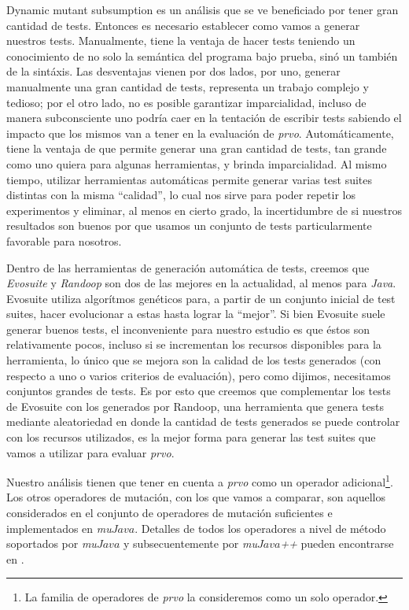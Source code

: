 Dynamic mutant subsumption es un an\'alisis que se ve beneficiado por tener gran cantidad de tests. Entonces es necesario establecer como vamos a generar nuestros tests. Manualmente, tiene la ventaja de hacer tests teniendo un conocimiento de no solo la sem\'antica del programa bajo prueba, sin\'o un tambi\'en de la sint\'axis. Las desventajas vienen por dos lados, por uno, generar manualmente una gran cantidad de tests, representa un trabajo complejo y tedioso; por el otro lado, no es posible garantizar imparcialidad, incluso de manera subconsciente uno podr\'ia caer en la tentaci\'on de escribir tests sabiendo el impacto que los mismos van a tener en la evaluaci\'on de \emph{prvo}. Autom\'aticamente, tiene la ventaja de que permite generar una gran cantidad de tests, tan grande como uno quiera para algunas herramientas, y brinda imparcialidad. Al mismo tiempo, utilizar herramientas autom\'aticas permite generar varias test suites distintas con la misma ``calidad'', lo cual nos sirve para poder repetir los experimentos y eliminar, al menos en cierto grado, la incertidumbre de si nuestros resultados son buenos por que usamos un conjunto de tests particularmente favorable para nosotros. 

Dentro de las herramientas de generaci\'on autom\'atica de tests, creemos que \emph{Evosuite} y \emph{Randoop} son dos de las mejores en la actualidad, al menos para \emph{Java}. Evosuite utiliza algor\'itmos gen\'eticos para, a partir de un conjunto inicial de test suites, hacer evolucionar a estas hasta lograr la ``mejor''. Si bien Evosuite suele generar buenos tests, el inconveniente para nuestro estudio es que \'estos son relativamente pocos, incluso si se incrementan los recursos disponibles para la herramienta, lo \'unico que se mejora son la calidad de los tests generados (con respecto a uno o varios criterios de evaluaci\'on), pero como dijimos, necesitamos conjuntos grandes de tests. Es por esto que creemos que complementar los tests de Evosuite con los generados por Randoop, una herramienta que genera tests mediante aleatoriedad en donde la cantidad de tests generados se puede controlar con los recursos utilizados, es la mejor forma para generar las test suites que vamos a utilizar para evaluar \emph{prvo}.

Nuestro an\'alisis tienen que tener en cuenta a \emph{prvo} como un operador adicional\footnote{La familia de operadores de \emph{prvo} la consideremos como un solo operador.}. Los otros operadores de mutaci\'on, con los que vamos a comparar, son aquellos considerados en el conjunto de operadores de mutaci\'on suficientes \cite{bibliography.mutation.selection.Offutt96, bibliography.mutation.selection.ASN2008} e implementados en \emph{mu$Java$}. Detalles de todos los operadores a nivel de m\'etodo soportados por \emph{mu$Java$} y subsecuentemente por \emph{mu$Java$++} pueden encontrarse en \cite{muJavaMOPS}. 


